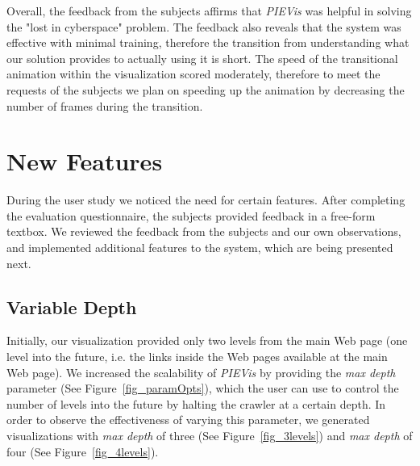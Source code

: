 \documentclass[]{article}
\begin{document}
{\begin{itemize}
\end{itemize}

Overall, the feedback from the subjects affirms that {\em PIEVis} was helpful in solving the "lost in cyberspace" problem.
The feedback also reveals that the system was effective with minimal training, therefore the transition from understanding what our solution provides to actually using it is short.
The speed of the transitional animation within the visualization scored moderately, therefore to meet the requests of the subjects we plan on speeding up the animation by decreasing the number of frames during the transition. 

\section{New Features}
\label{se:new_features}

During the user study we noticed the need for certain features.
After completing the evaluation questionnaire, the subjects provided feedback in a free-form textbox.
We reviewed the feedback from the subjects and our own observations, and implemented additional features to the system, which are being presented next.

\subsection{Variable Depth}
\label{ss:var_depth}

Initially, our visualization provided only two levels from the main Web page (one level into the future, i.e. the links inside the Web pages available at the main Web page).
We increased the scalability of {\em PIEVis} by providing the {\em max depth} parameter (See Figure~\ref{fig_paramOpts}), which the user can use to control the number of levels into the future by halting the crawler at a certain depth.
In order to observe the effectiveness of varying this parameter, we generated visualizations with {\em max depth} of three (See Figure~\ref{fig_3levels}) and {\em max depth} of four (See Figure~\ref{fig_4levels}).

}
\end{document}
